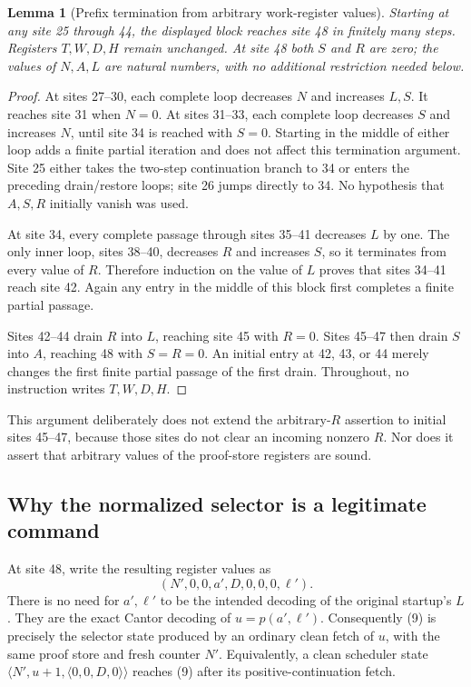 \documentclass[11pt]{article}
\newtheorem{lemma}{Lemma}
\begin{document}
\begin{lemma}[Prefix termination from arbitrary work-register values]
Starting at any site 25 through 44, the displayed block reaches site 48
in finitely many steps. Registers $T,W,D,H$ remain unchanged. At site 48
both $S$ and $R$ are zero; the values of $N,A,L$ are natural numbers, with
no additional restriction needed below.
\end{lemma}
\begin{proof}
At sites 27--30, each complete loop decreases $N$ and increases $L,S$.
It reaches site 31 when $N=0$. At sites 31--33, each complete loop
decreases $S$ and increases $N$, until site 34 is reached with $S=0$.
Starting in the middle of either loop adds a finite partial iteration
and does not affect this termination argument. Site 25 either takes the
two-step continuation branch to 34 or enters the preceding drain/restore
loops; site 26 jumps directly to 34. No hypothesis that $A,S,R$ initially
vanish was used.

At site 34, every complete passage through sites 35--41 decreases $L$
by one. The only inner loop, sites 38--40, decreases $R$ and increases
$S$, so it terminates from every value of $R$. Therefore induction on
the value of $L$ proves that sites 34--41 reach site 42. Again any entry
in the middle of this block first completes a finite partial passage.

Sites 42--44 drain $R$ into $L$, reaching site 45 with $R=0$.
Sites 45--47 then drain $S$ into $A$, reaching 48 with $S=R=0$.
An initial entry at 42, 43, or 44 merely changes the first finite partial
passage of the first drain. Throughout, no instruction writes $T,W,D,H$.
\end{proof}

This argument deliberately does not extend the arbitrary-$R$ assertion
to initial sites 45--47, because those sites do not clear an incoming
nonzero $R$. Nor does it assert that arbitrary values of the proof-store
registers are sound.

\subsection{Why the normalized selector is a legitimate command}

At site 48, write the resulting register values as
\[
               (N',0,0,a',D,0,0,0,\ell').
\tag{9}
\]
There is no need for $a',\ell'$ to be the intended decoding of the
original startup's $L$. They are the exact Cantor decoding of
$u=p(a',\ell')$. Consequently (9) is precisely the selector state
produced by an ordinary clean fetch of $u$, with the same proof store
and fresh counter $N'$. Equivalently, a clean scheduler state
$\langle N',u+1,\langle0,0,D,0\rangle\rangle$ reaches (9) after its
positive-continuation fetch.
\end{document}
